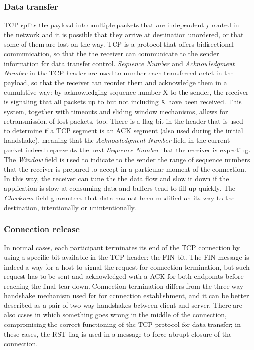\subsubsection{Data transfer}
TCP splits the payload into multiple packets that are independently routed in the network and it is possible that they arrive at destination unordered, or that some of them are lost on the way. TCP is a protocol that offers bidirectional communication, so that the the receiver can communicate to the sender information for data transfer control. \textit{Sequence Number} and \textit{Acknowledgment Number} in the TCP header are used to number each transferred octet in the payload, so that the receiver can reorder them and acknowledge them in a cumulative way: by acknowledging sequence number X to the sender, the receiver is signaling that all packets up to but not including X have been received. This system, together with timeouts and sliding window mechanisms, allows for retransmission of lost packets, too. There is a flag bit in the header that is used to determine if a TCP segment is an ACK segment (also used during the initial handshake), meaning that the \textit{Acknowledgment Number} field in the current packet indeed represents the next \textit{Sequence Number} that the receiver is expecting. 
The \textit{Window} field is used to indicate to the sender the range of sequence numbers that the receiver is prepared to accept in a particular moment of the connection. In this way, the receiver can tune the the data flow and slow it down if the application is slow at consuming data and buffers tend to fill up quickly. The \textit{Checksum} field guarantees that data has not been modified on its way to the destination, intentionally or unintentionally.

\subsubsection{Connection release}
In normal cases, each participant terminates its end of the TCP connection by using a specific bit available in the TCP header: the FIN bit. The FIN message is indeed a way for a host to signal the request for connection termination, but such request has to be sent and acknowledged with a ACK for both endpoints before reaching the final tear down. Connection termination differs from the three-way handshake mechanism used for for connection establishment, and it can be better described as a pair of two-way handshakes between client and server.
There are also cases in which something goes wrong in the middle of the connection, compromising the correct functioning of the TCP protocol for data transfer; in these cases, the RST flag is used in a message to force abrupt closure of the connection.
 
